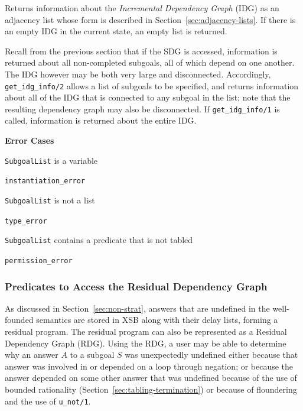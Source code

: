 \begin{description}
%


Returns information about the {\em Incremental Dependency Graph} (IDG)
as an adjacency list whose form is described in Section~\ref{sec:adjacency-lists}.
%
If there is an empty IDG in the current state, an empty list
is returned.

Recall from the previous section that if the SDG is accessed,
information is returned about all non-completed subgoals, all of which
depend on one another.  The IDG however may be both very large and
disconnected.  Accordingly, {\tt get\_idg\_info/2} allows a list of
subgoals to be specified, and returns information about all of the IDG
that is connected to any subgoal in the list; note that the resulting
dependency graph may also be disconnected.  If {\tt get\_idg\_info/1}
is called, information is returned about the entire IDG.

{\bf Error Cases}
\bi
\item {\tt SubgoalList} is a variable
\bi
\item 	{\tt instantiation\_error}
\ei
\item {\tt SubgoalList} is not a list
\bi
\item 	{\tt type\_error}
\ei
\item {\tt SubgoalList} contains a predicate that is not tabled
\bi
\item 	{\tt permission\_error}
\ei
\ei
\end{description}

\subsubsection{Predicates to Access the Residual Dependency Graph} \label{sec:rdg-preds}

As discussed in Section~\ref{sec:non-strat}, answers that are
undefined in the well-founded semantics are stored in XSB along with
their delay lists, forming a residual program.  The residual program
can also be represented as a Residual Dependency Graph (RDG).  Using
the RDG, a user may be able to determine why an answer $A$ to a
subgoal $S$ was unexpectedly undefined either because that answer was
involved in or depended on a loop through negation; or because the
answer depended on some other answer that was undefined because of the
use of bounded rationality (Section~\ref{sec:tabling-termination}) or
because of floundering and the use of {\tt u\_not/1}.

